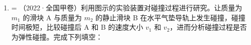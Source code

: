 \documentclass[\gkver]{gaokaozhenti}
\makeatletter
\newcommand{\tiinfo}[2]{{\small\color{gray}（#1）\textcolor{orange!85!black}{\nandu{#2}}}\hspace{0.4em}}
\newenvironment{tibody}
  {\begin{minipage}[t]{\linewidth}\@listdepth=\@ne\leavevmode\ignorespaces}
  {\end{minipage}}
\makeatother
\begin{document}
\begin{enumerate}[resume=tiku]
{碰撞后 $a$ 的速度大小 $v_{a} = \frac{x_{M}}{t}$

碰撞后 $b$ 球的速度大小 $v_{b} = \frac{x_{N}}{t}$

如果碰撞过程系统动量守恒，则碰撞前后系统动量相等，则

$m_{a}v_{0} = m_{a}v_{a} + m_{b}v_{b}$

整理得 $m_{a}x_{P} = m_{a}x_{M} + m_{b}x_{N}$

小球离开斜槽末端后做平抛运动，竖直方向高度相同故下落时间相同，水平方向做匀速直线运动，小球水平飞出时的速度与平抛运动的水平位移成正比。
}

\item
\begin{tibody}
\tiinfo{2022·全国甲卷}{3}利用图示的实验装置对碰撞过程进行研究。让质量为 $m_{1}$ 的滑块 A 与质量为 $m_{2}$ 的静止滑块 B 在水平气垫导轨上发生碰撞，碰撞时间极短，比较碰撞后 A 和 B 的速度大小 $v_{1}$ 和 $v_{2}$，进而分析碰撞过程是否为弹性碰撞。完成下列填空：



\end{tibody}
\end{enumerate}
\end{document}
